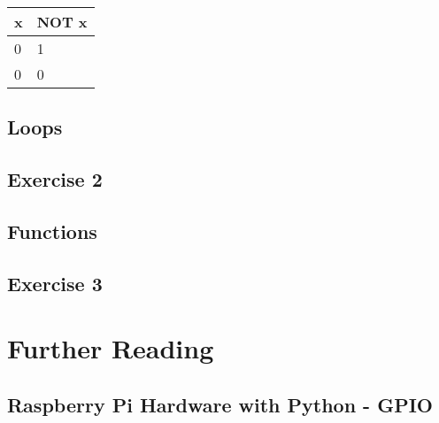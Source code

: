 \documentclass[twocolumn]{article}
\begin{document}
\begin{center}
	\begin{tabular}{| l | l | } 
		\hline
		x & NOT x \\ \hline
		0 & 1 \\
		0 & 0 \\
		\hline
	\end{tabular}
\end{center}

\subsection{Loops}

\subsection{Exercise 2}

\subsection{Functions}

\subsection{Exercise 3}

\section{Further Reading}

\subsection{Raspberry Pi Hardware with Python - GPIO}
\end{document}
